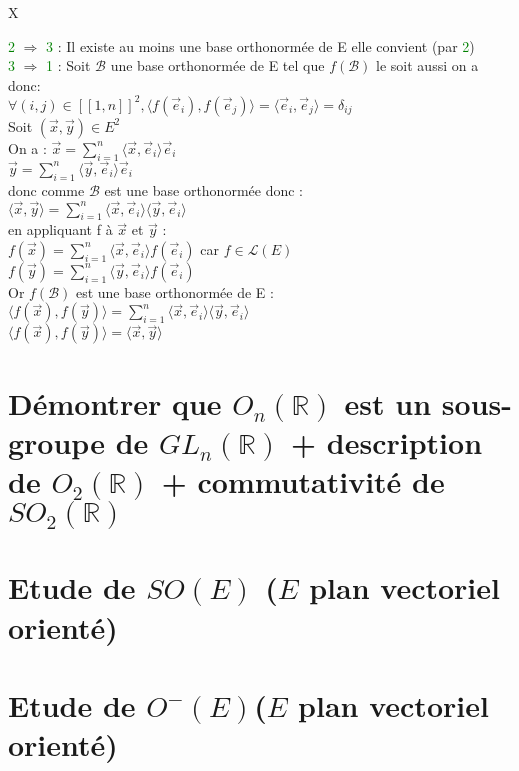 X\documentclass{article}
\begin{document}
\textcolor{green}{2} $\Rightarrow$ \textcolor{green}{3} : Il existe au moins une base orthonormée de E elle convient (par \textcolor{green}{2}) \\
\textcolor{green}{3} $\Rightarrow$ \textcolor{green}{1} : Soit $\mathcal B$ une base orthonormée de E tel que $f (\mathcal B)$ le soit aussi on a donc: \\
$\forall(i,j) \in [[1,n]]^2, \langle f(\vec e_i),f(\vec e_j) \rangle = \langle \vec e_i, \vec e_j \rangle =\delta_{ij}$ \\
Soit $(\vec x, \vec y) \in E^2$ \\
On a : $\vec x= \sum_{i=1}^n \langle \vec x, \vec e_i \rangle \vec e_i$ \\
$\vec y= \sum_{i=1}^n \langle \vec y, \vec e_i \rangle  \vec e_i$ \\
donc comme $\mathcal B$ est une base orthonormée donc : \\
$\langle \vec x, \vec y \rangle= \sum_{i=1}^n \langle \vec x, \vec e_i \rangle \langle \vec y, \vec e_i \rangle$ \\
en appliquant f à $\vec x$ et $\vec y$ : \\
$f(\vec x)=\sum_{i=1}^n \langle \vec x, \vec e_i \rangle f(\vec e_i)$ car $f\in \mathcal L(E)$ \\
$f(\vec y)= \sum_{i=1}^n \langle \vec y, \vec e_i \rangle f(\vec e_i)$ \\
Or $f(\mathcal B)$ est une base orthonormée de E : \\
$\langle f(\vec x), f(\vec y) \rangle = \sum_{i=1}^n \langle \vec x, \vec e_i \rangle \langle \vec y, \vec e_i \rangle$ \\
$\langle f(\vec x), f(\vec y) \rangle =\langle \vec x,\vec y \rangle $
\section{Démontrer que $O_n(\mathbb R)$ est un sous-groupe de $GL_n(\mathbb R)$ + description de $O_2 (\mathbb R)$ + commutativité de $SO_2(\mathbb R)$}
\section{Etude de $SO(E)$ ($E$ plan vectoriel orienté)}
\section{Etude de $O^-(E)$($E$ plan vectoriel orienté)}
\end{document}
